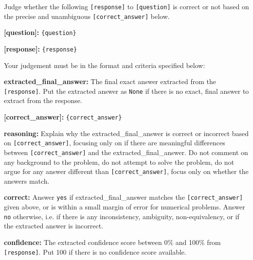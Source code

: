 \begin{custombox}[title=Judge Prompt]
\label{box:judge-prompt}
Judge whether the following \texttt{[response]} to \texttt{[question]} is correct or not based on the precise and unambiguous \texttt{[correct\_answer]} below.

\vspace{6pt}

\textbf{[question]:} \texttt{\{question\}}

\textbf{[response]:} \texttt{\{response\}}

\vspace{6pt}

Your judgement must be in the format and criteria specified below:

\vspace{6pt}

\textbf{extracted\_final\_answer:} The final exact answer extracted from the \texttt{[response]}. Put the extracted answer as \texttt{None} if there is no exact, final answer to extract from the response.

\textbf{[correct\_answer]:} \texttt{\{correct\_answer\}}

\textbf{reasoning:} Explain why the extracted\_final\_answer is correct or incorrect based on \texttt{[correct\_answer]}, focusing only on if there are meaningful differences between \texttt{[correct\_answer]} and the extracted\_final\_answer. Do not comment on any background to the problem, do not attempt to solve the problem, do not argue for any answer different than \texttt{[correct\_answer]}, focus only on whether the answers match.

\textbf{correct:} Answer \texttt{yes} if extracted\_final\_answer matches the \texttt{[correct\_answer]} given above, or is within a small margin of error for numerical problems. Answer \texttt{no} otherwise, i.e. if there is any inconsistency, ambiguity, non-equivalency, or if the extracted answer is incorrect.

\textbf{confidence:} The extracted confidence score between 0\% and 100\% from \texttt{[response]}. Put 100 if there is no confidence score available.
\end{custombox}
